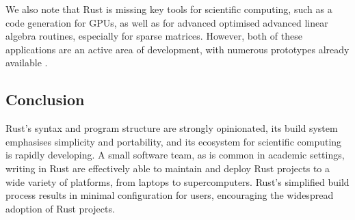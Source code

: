 We also note that Rust is missing key tools for scientific computing, such as a code generation for GPUs, as well as for advanced optimised advanced linear algebra routines, especially for sparse matrices. However, both of these applications are an active area of development, with numerous prototypes already available \cite{rustcuda2022github}.

\subsection*{Conclusion}

Rust's syntax and program structure are strongly opinionated, its build system emphasises simplicity and portability, and its ecosystem for scientific computing is rapidly developing. A small software team, as is common in academic settings, writing in Rust are effectively able to maintain and deploy Rust projects to a wide variety of platforms, from laptops to supercomputers. Rust's simplified build process results in minimal configuration for users, encouraging the widespread adoption of Rust projects.
